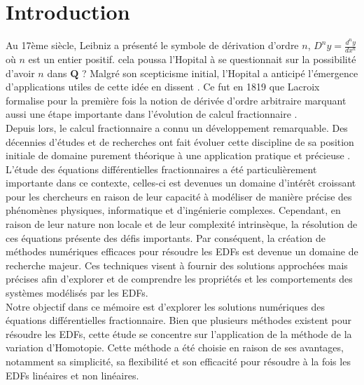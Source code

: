 

\chapter{Introduction}
\label{chap:intro}
\pagestyle{fancy}

Au 17ème siècle, Leibniz a présenté le symbole de dérivation d'ordre $n$, $D^n y = \frac{d^n y}{dx^n} $ où $n$ est un entier positif. cela poussa l'Hopital à se questionnait sur la possibilité d'avoir $n$ dans $\mathbf{Q}$ ? Malgré son scepticisme initial, l'Hopital a anticipé l'émergence d'applications utiles de cette idée en dissent . Ce fut en 1819 que Lacroix formalise pour la première fois la notion de dérivée d'ordre arbitraire marquant aussi une étape importante dans l'évolution de calcul fractionnaire \cite{FC_ross}.\\

Depuis lors, le calcul fractionnaire a connu un développement remarquable.  Des décennies d'études et de recherches ont fait évoluer cette discipline de sa position initiale de domaine purement théorique à une application pratique et précieuse \cite{FDEs_intro}.\\

L'étude des équations différentielles fractionnaires a été particulièrement importante dans ce contexte, celles-ci est devenues un domaine d'intérêt croissant pour les chercheurs en raison de leur capacité à modéliser de manière précise des phénomènes physiques, informatique et d'ingénierie complexes. Cependant, en raison de leur nature non locale et de leur complexité intrinsèque, la résolution de ces équations présente des défis importants. Par conséquent, la création de méthodes numériques efficaces pour résoudre les EDFs est devenue un domaine de recherche majeur. Ces techniques visent à fournir des solutions approchées mais précises afin d'explorer et de comprendre les propriétés et les comportements des systèmes modélisés par les EDFs.\\

Notre objectif dans ce mémoire est d'explorer les solutions numériques des équations différentielles fractionnaire. Bien que plusieurs méthodes existent pour résoudre les EDFs, cette étude se concentre sur l'application de la méthode de la variation d'Homotopie. Cette méthode a été choisie en raison de ses avantages, notamment sa simplicité, sa flexibilité et son efficacité pour résoudre à la fois les EDFs linéaires et non linéaires.\\

